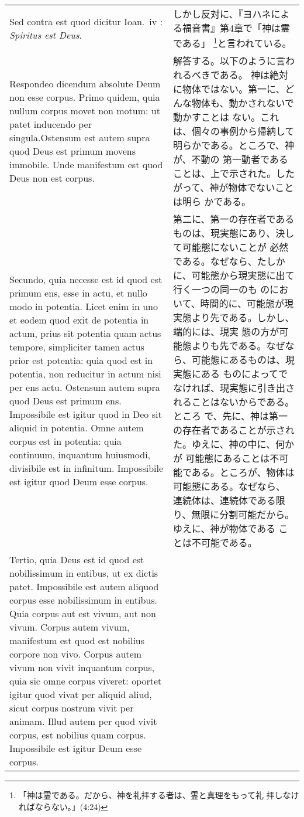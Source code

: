 \documentclass[10pt]{jsarticle} %
\begin{document}
\begin{longtable}{p{21em}p{21em}}
{\sc Sed contra est} quod dicitur Ioan.~{\sc iv} : {\it Spiritus est Deus}.

&
しかし反対に、『ヨハネによる福音書』第4章で「神は霊である」
 \footnote{「神は霊である。だから、神を礼拝する者は、霊と真理をもって礼
 拝しなければならない。」(4:24)}と言われている。

\\

{\sc Respondeo dicendum} absolute Deum non esse corpus.  Primo quidem,
quia nullum corpus movet non motum: ut patet inducendo per
singula.Ostensum est autem supra quod Deus est primum movens immobile.
Unde manifestum est quod Deus non est corpus.

&

解答する。以下のように言われるべきである。
神は絶対に物体ではない。第一に、どんな物体も、動かされないで動かすことは
ない。これは、個々の事例から帰納して明らかである。ところで、神が、不動の
第一動者であることは、上で示された。したがって、神が物体でないことは明ら
かである。

\\


Secundo, quia necesse est id quod est primum ens, esse in actu, et nullo
modo in potentia.  Licet enim in uno et eodem quod exit de potentia in
actum, prius sit potentia quam actus tempore, simpliciter tamen actus
prior est potentia: quia quod est in potentia, non reducitur in actum
nisi per ens actu.  Ostensum autem supra quod Deus est primum ens.
Impossibile est igitur quod in Deo sit aliquid in potentia.  Omne autem
corpus est in potentia: quia continuum, inquantum huiusmodi, divisibile
est in infinitum.  Impossibile est igitur quod Deum esse corpus.


&

第二に、第一の存在者であるものは、現実態にあり、決して可能態にないことが
必然である。なぜなら、たしかに、可能態から現実態に出て行く一つの同一のも
のにおいて、時間的に、可能態が現実態より先である。しかし、端的には、現実
態の方が可能態よりも先である。なぜなら、可能態にあるものは、現実態にある
ものによってでなければ、現実態に引き出されることはないからである。ところ
で、先に、神は第一の存在者であることが示された。ゆえに、神の中に、何かが
可能態にあることは不可能である。ところが、物体は可能態にある。なぜなら、
連続体は、連続体である限り、無限に分割可能だから。ゆえに、神が物体である
ことは不可能である。

\\

Tertio, quia Deus est id quod est nobilissimum in entibus, ut ex dictis
patet.  Impossibile est autem aliquod corpus esse nobilissimum in
entibus.  Quia corpus aut est vivum, aut non vivum.  Corpus autem vivum,
manifestum est quod est nobilius corpore non vivo.  Corpus autem vivum
non vivit inquantum corpus, quia sic omne corpus viveret: oportet igitur
quod vivat per aliquid aliud, sicut corpus nostrum vivit per animam.
Illud autem per quod vivit corpus, est nobilius quam corpus.
Impossibile est igitur Deum esse corpus.


\end{longtable}
\end{document}
